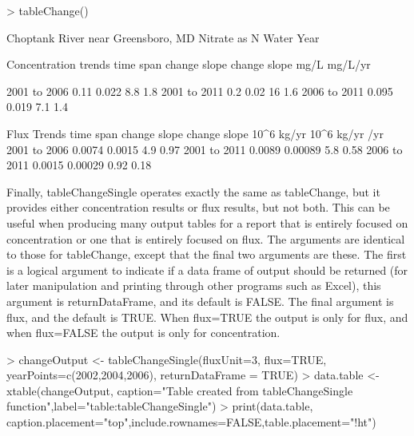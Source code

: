 \documentclass[a4paper,11pt]{article}
\begin{document}
\begin{Schunk}
\begin{Sinput}
> tableChange()
\end{Sinput}
\begin{Soutput}
   Choptank River near Greensboro, MD 
   Nitrate as N
   Water Year 

           Concentration trends
   time span       change     slope    change     slope
                     mg/L   mg/L/yr        %

 2001  to  2006      0.11     0.022       8.8       1.8
 2001  to  2011       0.2      0.02        16       1.6
 2006  to  2011     0.095     0.019       7.1       1.4


                 Flux Trends
   time span          change        slope       change        slope
                  10^6 kg/yr    10^6 kg/yr /yr      %
 2001  to  2006       0.0074       0.0015          4.9         0.97
 2001  to  2011       0.0089      0.00089          5.8         0.58
 2006  to  2011       0.0015      0.00029         0.92         0.18
\end{Soutput}
\end{Schunk}

Finally, tableChangeSingle operates exactly the same as tableChange, but it provides either concentration results or flux results, but not both.  This can be useful when producing many output tables for a report that is entirely focused on concentration or one that is entirely focused on flux.  The arguments are identical to those for tableChange, except that the final two arguments are these.  The first is a logical argument to indicate if a data frame of output should be returned (for later manipulation and printing through other programs such as Excel), this argument is returnDataFrame, and its default is FALSE.  The final argument is flux, and the default is TRUE.  When flux=TRUE the output is only for flux, and when flux=FALSE the output is only for concentration.  


\begin{Schunk}
\begin{Sinput}
> changeOutput <- tableChangeSingle(fluxUnit=3, flux=TRUE,
         yearPoints=c(2002,2004,2006), returnDataFrame = TRUE)
> data.table <- xtable(changeOutput, caption="Table created from tableChangeSingle function",label="table:tableChangeSingle")
> print(data.table, caption.placement="top",include.rownames=FALSE,table.placement="!ht")
\end{Sinput}
\end{Schunk}
\end{document}
